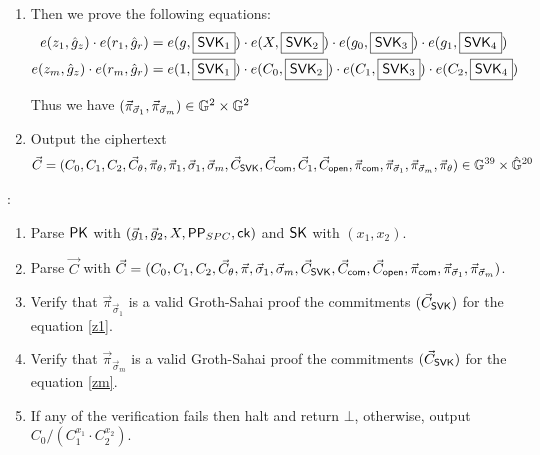 \begin{description}
\begin{enumerate}
  \item Then we prove the following equations:
    \begin{align}
      e(z_1, \hat{g}_z) \cdot e(r_1, \hat{g}_r) &= e(g, \boxed{\mathsf{SVK}_1}) \cdot e(X, \boxed{\mathsf{SVK}_2}) \cdot e(g_0, \boxed{\mathsf{SVK}_3}) \cdot e(g_1, \boxed{\mathsf{SVK}_4}) \label{z1}\\
      e(z_m, \hat{g}_z) \cdot e(r_m, \hat{g}_r) &= e(1, \boxed{\mathsf{SVK}_1}) \cdot e(C_0, \boxed{\mathsf{SVK}_2}) \cdot e(C_1, \boxed{\mathsf{SVK}_3}) \cdot e(C_2, \boxed{\mathsf{SVK}_4}) \label{zm}
    \end{align}

    Thus we have $(\vec{\pi}_{\vec{\sigma}_1}, \vec{\pi}_{\vec{\sigma}_m}) \in \mathbb{G}^2 \times \mathbb{G}^2$
  
  \item Output the ciphertext
    \begin{align*}
      \vec{C} = (C_0, C_1, C_2, \vec{C}_{\theta}, \vec{\pi}_{\theta}, \vec{\pi}_{1}, \vec{\sigma}_1, \vec{\sigma}_m, \vec{C}_{\mathsf{SVK}}, \vec{C}_{\mathsf{com}}, \vec{C}_1, \vec{C}_{\mathsf{open}},  \vec{\pi}_{\mathsf{com}}, \vec{\pi}_{\vec{\sigma}_1}, \vec{\pi}_{\vec{\sigma}_m}, \vec{\pi}_{\theta}) \in \mathbb{G}^{39} \times \hat{\mathbb{G}}^{20}
    \end{align*}
    

    
  \end{enumerate}
  
\item[\boldmath{$RCCA2.\Dec(\PK, \vec{C}, \SK)$}]:
  \begin{enumerate}
  \item Parse $\mathsf{PK}$ with $(\vec{g}_1, \vec{g}_2, X, \mathsf{PP}_{SPC}, \mathsf{ck})$ and $\mathsf{SK}$ with $(x_1, x_2)$.
  \item Parse $\vec{C}$ with $\vec{C} = (C_0, C_1, C_2, \vec{C}_{\theta}, \vec{\pi}, \vec{\sigma}_1, \vec{\sigma}_m, \vec{C}_{\mathsf{SVK}}, \vec{C}_{\mathsf{com}}, \vec{C}_{\mathsf{open}},  \vec{\pi}_{\mathsf{com}}, \vec{\pi}_{\vec{\sigma}_1}, \vec{\pi}_{\vec{\sigma}_m})$.
  \item Verify that $\vec{\pi}_{\vec{\sigma}_1}$ is a valid Groth-Sahai proof \wrt the commitments $(\vec{C}_{\mathsf{SVK}})$ for the equation \ref{z1}.
  \item Verify that $\vec{\pi}_{\vec{\sigma}_m}$ is a valid Groth-Sahai proof \wrt the commitments $(\vec{C}_{\mathsf{SVK}})$ for the equation \ref{zm}.
  \item If any of the verification fails then halt and return $\bot$, otherwise, output $C_0/(C_1^{x_1}\cdot C_2^{x_2})$.
  \end{enumerate}



\end{description}
